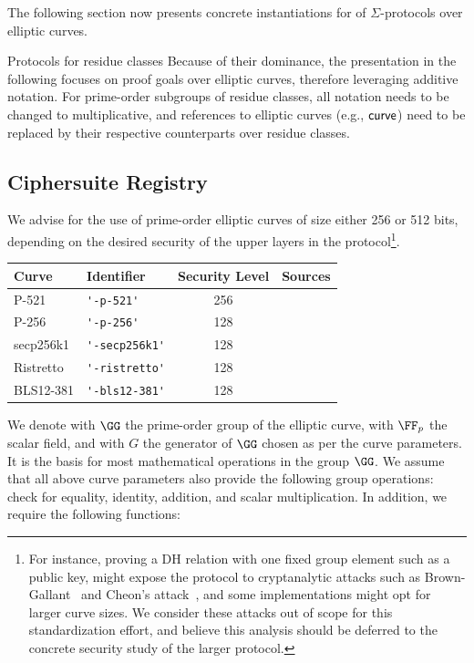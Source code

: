 \documentclass[11pt]{article}
\begin{document}
The following section now presents concrete instantiations for of $\Sigma$-protocols over elliptic curves.

\begin{remark}{Protocols for residue classes}{}
  Because of their dominance, the presentation in the following focuses on proof goals over elliptic curves, therefore leveraging additive notation.
	For prime-order subgroups of residue classes, all notation needs to be changed to multiplicative, and references to elliptic curves (e.g., $\textsf{curve}$) need to be replaced by their respective counterparts over residue classes.
\end{remark}

\subsection{Ciphersuite Registry}
 We advise for the use of prime-order elliptic curves of size either 256 or 512 bits, depending on the desired security of the upper layers in the protocol\footnote{For instance, proving a DH relation with one fixed group element such as a public key, might expose the protocol to cryptanalytic attacks such as Brown-Gallant~\cite{EPRINT:BroGal04} and Cheon’s attack~\cite{EC:Cheon06}, and some implementations might opt for larger curve sizes. We consider these attacks out of scope for this standardization effort, and believe this analysis should be deferred to the concrete security study of the larger protocol.}.

 \vspace{1em}
 \begin{center}
 \begin{tabular}{llcc}
  \hline
  Curve  & Identifier &  Security Level & Sources \\
  \hline
 P-521 & \verb|'-p-521'|     & 256& \cite{fips2} \\
 P-256 & \verb|'-p-256'|     & 128 & \cite{fips2}  \\
 secp256k1 & \verb|'-secp256k1'| & 128 & \cite{SECG} \\
 Ristretto & \verb|'-ristretto'| & 128 & \cite{cfrg-ristretto-decaf} \\
 BLS12-381 & \verb|'-bls12-381'| & 128 & \cite{bls12} \\
 \end{tabular}
\end{center}
We denote with $\GG$ the prime-order group of the elliptic curve, with $\FF_p$ the scalar field, and with $G$ the generator of $\GG$ chosen as per the curve parameters. It is the basis for most mathematical operations in the group $\GG$.
We assume that all above curve parameters also provide the following group operations: check for equality, identity, addition, and scalar multiplication.
In addition, we require the following functions:
\end{document}
